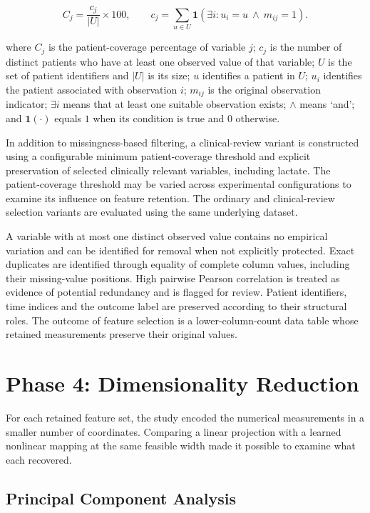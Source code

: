 \[
C_j=\frac{c_j}{|U|}\times100,\qquad
c_j=\sum_{u\in U}\mathbf{1}\!
\left(\exists i:u_i=u\ \land\ m_{ij}=1\right).\tag{3.6.2}
\]

\noindent where \(C_j\) is the patient-coverage percentage of variable \(j\);
\(c_j\) is the number of distinct patients who have at least one
observed value of that variable; \(U\) is the set of patient identifiers
and \(|U|\) is its size; \(u\) identifies a patient in \(U\); \(u_i\)
identifies the patient associated with observation \(i\); \(m_{ij}\) is
the original observation indicator; \(\exists i\) means that at least
one suitable observation exists; \(\land\) means `and'; and
\(\mathbf{1}(\cdot)\) equals \(1\) when its condition is true and \(0\)
otherwise.

\noindent In addition to missingness-based filtering, a clinical-review variant is constructed using a configurable minimum patient-coverage threshold and explicit preservation of selected clinically relevant variables, including lactate. The patient-coverage threshold may be varied across experimental configurations to examine its influence on feature retention. The ordinary and clinical-review selection variants are evaluated using the same underlying dataset.

\noindent A variable with at most one distinct observed value contains no
empirical variation and can be identified for removal when not
explicitly protected. Exact duplicates are identified through equality
of complete column values, including their missing-value positions. High
pairwise Pearson correlation is treated as evidence of potential
redundancy and is flagged for review. Patient identifiers, time indices
and the outcome label are preserved according to their structural roles.
The outcome of feature selection is a lower-column-count data table
whose retained measurements preserve their original values.

\section{Phase 4: Dimensionality
	Reduction}\label{phase-4-dimensionality-reduction}

\noindent For each retained feature set, the study encoded the numerical measurements in a smaller number of coordinates. Comparing a linear projection with a learned nonlinear mapping at the same feasible width made it possible to examine what each recovered.

\subsection{Principal Component Analysis}\label{sec:pca-method}

